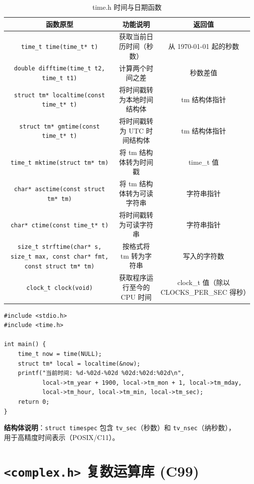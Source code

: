 \begin{table}[H]
\centering
\renewcommand{\arraystretch}{1.6}
\begin{tabulary}{\linewidth}{CCC}
\toprule
\textbf{函数原型} & \textbf{功能说明} & \textbf{返回值} \\ \midrule
\texttt{time\_t time(time\_t* t)} & 获取当前日历时间（秒数） & 从 1970-01-01 起的秒数 \\ 
\texttt{double difftime(time\_t t2, time\_t t1)} & 计算两个时间之差 & 秒数差值 \\ 
\texttt{struct tm* localtime(const time\_t* t)} & 将时间戳转为本地时间结构体 & tm 结构体指针 \\ 
\texttt{struct tm* gmtime(const time\_t* t)} & 将时间戳转为 UTC 时间结构体 & tm 结构体指针 \\ 
\texttt{time\_t mktime(struct tm* tm)} & 将 tm 结构体转为时间戳 & time\_t 值 \\ 
\texttt{char* asctime(const struct tm* tm)} & 将 tm 结构体转为可读字符串 & 字符串指针 \\ 
\texttt{char* ctime(const time\_t* t)} & 将时间戳转为可读字符串 & 字符串指针 \\ 
\texttt{size\_t strftime(char* s, size\_t max, const char* fmt, const struct tm* tm)} & 按格式将 tm 转为字符串 & 写入的字符数 \\ 
\texttt{clock\_t clock(void)} & 获取程序运行至今的 CPU 时间 & clock\_t 值（除以 CLOCKS\_PER\_SEC 得秒） \\ \bottomrule
\end{tabulary}
\caption{time.h 时间与日期函数}
\label{tab:time_funcs}
\end{table}

\begin{lstlisting}[caption={time.h 使用示例}]
#include <stdio.h>
#include <time.h>

int main() {
    time_t now = time(NULL);
    struct tm* local = localtime(&now);
    printf("当前时间: %d-%02d-%02d %02d:%02d:%02d\n",
           local->tm_year + 1900, local->tm_mon + 1, local->tm_mday,
           local->tm_hour, local->tm_min, local->tm_sec);
    return 0;
}
\end{lstlisting}

\vspace{0.5em}
\noindent\textbf{结构体说明}：\texttt{struct timespec} 包含 \texttt{tv\_sec}（秒数）和 \texttt{tv\_nsec}（纳秒数），\\用于高精度时间表示（POSIX/C11）。

\section{\texorpdfstring{\texttt{<complex.h>} 复数运算库 (C99)}{<complex.h> 复数运算库 (C99)}}

